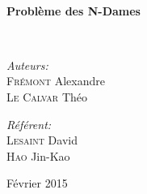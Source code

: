 \begin{titlepage}
\begin{center}





\HRule \\[0.4cm]
{ \huge \bfseries Problème des N-Dames \\[0.4cm] }

\HRule \\[1.5cm]

\begin{minipage}{0.4\textwidth}
\begin{flushleft} \large
\emph{Auteurs:}\\
\textsc{Frémont} Alexandre\\
\textsc{Le Calvar} Théo\\

\end{flushleft}
\end{minipage}
\begin{minipage}{0.4\textwidth}
\begin{flushright} \large
\emph{Référent:} \\
\textsc{Lesaint} David \\
\textsc{Hao} Jin-Kao
\end{flushright}
\end{minipage}

\vfill

{\large Février 2015}

\end{center}
\end{titlepage}
